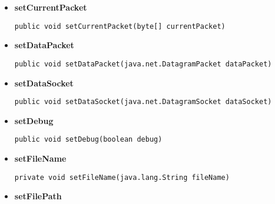 {{{{{\begin{itemize}
{\begin{lstlisting}[frame=none]
public void setConnectionIP(java.lang.String connectionName)\end{lstlisting} %
}%
\item{ 
\hypertarget{filetransferUDP.FileTransfer.setCurrentPacket(byte[])}{{\bf  setCurrentPacket}\\}
\begin{lstlisting}[frame=none]
public void setCurrentPacket(byte[] currentPacket)\end{lstlisting} %
}%
\item{ 
\hypertarget{filetransferUDP.FileTransfer.setDataPacket(java.net.DatagramPacket)}{{\bf  setDataPacket}\\}
\begin{lstlisting}[frame=none]
public void setDataPacket(java.net.DatagramPacket dataPacket)\end{lstlisting} %
}%
\item{ 
\hypertarget{filetransferUDP.FileTransfer.setDataSocket(java.net.DatagramSocket)}{{\bf  setDataSocket}\\}
\begin{lstlisting}[frame=none]
public void setDataSocket(java.net.DatagramSocket dataSocket)\end{lstlisting} %
}%
\item{ 
\hypertarget{filetransferUDP.FileTransfer.setDebug(boolean)}{{\bf  setDebug}\\}
\begin{lstlisting}[frame=none]
public void setDebug(boolean debug)\end{lstlisting} %
}%
\item{ 
\hypertarget{filetransferUDP.FileTransfer.setFileName(java.lang.String)}{{\bf  setFileName}\\}
\begin{lstlisting}[frame=none]
private void setFileName(java.lang.String fileName)\end{lstlisting} %
}%
\item{ 
\hypertarget{filetransferUDP.FileTransfer.setFilePath(java.lang.String)}{{\bf  setFilePath}\\}
\begin{lstlisting}[frame=none]

\end{lstlisting}}
\end{itemize}}}}}}
